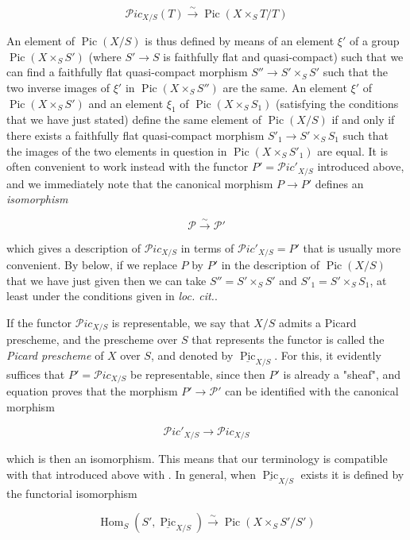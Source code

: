 \begin{equation}\tag{1.7}\label{fga3.v-1-equation-1.7}
    \mathcal{P}ic_{X/S}(T) \xrightarrow{\sim} \operatorname{Pic}(X\times_S T/T)
\end{equation}

An element of $\operatorname{Pic}(X/S)$ is thus defined by means of an element $\xi'$ of a group $\operatorname{Pic}(X\times_S S')$ (where $S'\to S$ is faithfully flat and quasi-compact) such that we can find a faithfully flat quasi-compact morphism $S''\to S'\times_S S'$ such that the two inverse images of $\xi'$ in $\operatorname{Pic}(X\times_S S'')$ are the same.
An element $\xi'$ of $\operatorname{Pic}(X\times_S S')$ and an element $\xi_1$ of $\operatorname{Pic}(X\times_S S_1)$ (satisfying the conditions that we have just stated) define the same element of $\operatorname{Pic}(X/S)$ if and only if there exists a faithfully flat quasi-compact morphism $S'_1\to S'\times_S S_1$ such that the images of the two elements in question in $\operatorname{Pic}(X\times_S S'_1)$ are equal.
It is often convenient to work instead with the functor $P'=\mathcal{P}ic'_{X/S}$ introduced above, and we immediately note that the canonical morphism $P\to P'$ defines an \emph{isomorphism}

\begin{equation}\tag{1.8}\label{fga3.v-1-equation-1.8}
    \mathcal{P} \xrightarrow{\sim} \mathcal{P}'
\end{equation}

which gives a description of $\mathcal{P}ic_{X/S}$ in terms of $\mathcal{P}ic'_{X/S}=P'$ that is usually more convenient.
By  below, if we replace $P$ by $P'$ in the description of $\operatorname{Pic}(X/S)$ that we have just given then we can take $S''=S'\times_S S'$ and $S'_1=S'\times_S S_1$, at least under the conditions given in \emph{loc. cit.}.

If the functor $\mathcal{P}ic_{X/S}$ is representable, we say that $X/S$ admits a Picard prescheme, and the prescheme over $S$ that represents the functor is called the \emph{Picard prescheme} of $X$ over $S$, and denoted by $\underline{\operatorname{Pic}}_{X/S}$.
For this, it evidently suffices that $P'=\mathcal{P}ic_{X/S}$ be representable, since then $P'$ is already a "sheaf", and equation  proves that the morphism $P'\to\mathcal{P}'$ can be identified with the canonical morphism

\begin{equation}\tag{1.9}\label{fga3.v-1-equation-1.9}
    \mathcal{P}ic'_{X/S} \to \mathcal{P}ic_{X/S}
\end{equation}

which is then an isomorphism.
This means that our terminology is compatible with that introduced above with .
In general, when $\underline{\operatorname{Pic}}_{X/S}$ exists it is defined by the functorial isomorphism

\begin{equation}\tag{1.10}\label{fga3.v-1-equation-1.10}
    \operatorname{Hom}_S(S',\underline{\operatorname{Pic}}_{X/S}) \xrightarrow{\sim} \operatorname{Pic}(X\times_S S'/S')
\end{equation}
